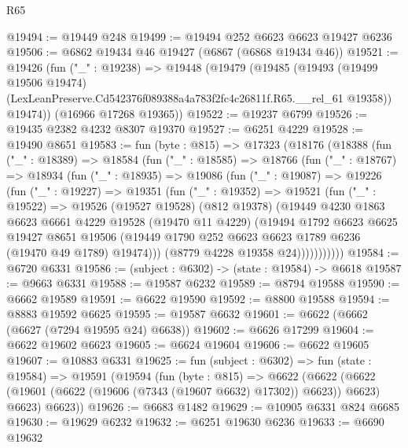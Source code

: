 \begin{lexlean}{R65}
\begin{coremodule}
{@19494 := @19449 @248
@19499 := @19494 @252 @6623 @6623 @19427 @6236
@19506 := @6862 @19434 @46 @19427 (@6867 (@6868 @19434 @46))
@19521 := @19426
    (fun ("_" : @19238) =>
    @19448
      (@19479
        (@19485
          (@19493
            (@19499 @19506 @19474)
            (LexLeanPreserve.Cd542376f089388a4a783f2fc4c26811f.R65.__rel_61 @19358))
          @19474))
      (@16966 @17268 @19365))
@19522 := @19237 @6799
@19526 := @19435 @2382 @4232 @8307 @19370
@19527 := @6251 @4229
@19528 := @19490 @8651
@19583 := fun (byte : @815) =>
  @17323
    (@18176
      (@18388
        (fun ("_" : @18389) =>
        @18584
          (fun ("_" : @18585) =>
          @18766
            (fun ("_" : @18767) =>
            @18934
              (fun ("_" : @18935) =>
              @19086
                (fun ("_" : @19087) =>
                @19226
                  (fun ("_" : @19227) =>
                  @19351
                    (fun ("_" : @19352) =>
                    @19521
                      (fun ("_" : @19522) =>
                      @19526
                        (@19527 @19528)
                        (@812 @19378)
                        (@19449
                          @4230
                          @1863
                          @6623
                          @6661
                          @4229
                          @19528
                          (@19470 @11 @4229)
                          (@19494
                            @1792
                            @6623
                            @6625
                            @19427
                            @8651
                            @19506
                            (@19449 @1790 @252 @6623 @6623 @1789 @6236 (@19470 @49 @1789) @19474)))
                        (@8779 @4228 @19358 @24)))))))))))
@19584 := @6720 @6331
@19586 := (subject : @6302) -> (state : @19584) -> @6618
@19587 := @9663 @6331
@19588 := @19587 @6232
@19589 := @8794 @19588
@19590 := @6662 @19589
@19591 := @6622 @19590
@19592 := @8800 @19588
@19594 := @8883 @19592 @6625
@19595 := @19587 @6632
@19601 := @6622 (@6662 (@6627 (@7294 @19595 @24) @6638))
@19602 := @6626 @17299
@19604 := @6622 @19602 @6623
@19605 := @6624 @19604
@19606 := @6622 @19605
@19607 := @10883 @6331
@19625 := fun (subject : @6302) =>
  fun (state : @19584) =>
  @19591
    (@19594
      (fun (byte : @815) =>
      @6622
        (@6622 (@6622 (@19601 (@6622 (@19606 (@7343 (@19607 @6632) @17302)) @6623)) @6623) @6623)
        @6623))
@19626 := @6683 @1482
@19629 := @10905 @6331 @824 @6685
@19630 := @19629 @6232
@19632 := @6251 @19630 @6236
@19633 := @6690 @19632
}
\end{coremodule}
\end{lexlean}
